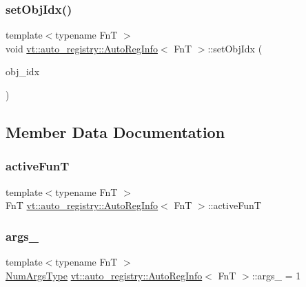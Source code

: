 \subsubsection{\texorpdfstring{set\+Obj\+Idx()}{setObjIdx()}}
{\footnotesize\ttfamily template$<$typename FnT $>$ \\
void \hyperlink{structvt_1_1auto__registry_1_1_auto_reg_info}{vt\+::auto\+\_\+registry\+::\+Auto\+Reg\+Info}$<$ FnT $>$\+::set\+Obj\+Idx (\begin{DoxyParamCaption}\item[{\hyperlink{namespacevt_1_1auto__registry_ae295e18699146815bb7d7674594d95d7}{Auto\+Handler\+Type} const}]{obj\+\_\+idx }\end{DoxyParamCaption})\hspace{0.3cm}{\ttfamily [inline]}}



\subsection{Member Data Documentation}
\mbox{\label{structvt_1_1auto__registry_1_1_auto_reg_info_a0ce7e02e8be36c770dead608e23709c6}} 
\subsubsection{\texorpdfstring{active\+FunT}{activeFunT}}
{\footnotesize\ttfamily template$<$typename FnT $>$ \\
FnT \hyperlink{structvt_1_1auto__registry_1_1_auto_reg_info}{vt\+::auto\+\_\+registry\+::\+Auto\+Reg\+Info}$<$ FnT $>$\+::active\+FunT}

\mbox{\label{structvt_1_1auto__registry_1_1_auto_reg_info_a861ecaa80da263959457a5429c3a3716}} 
\subsubsection{\texorpdfstring{args\+\_\+}{args\_}}
{\footnotesize\ttfamily template$<$typename FnT $>$ \\
\hyperlink{namespacevt_1_1auto__registry_aebda1d9d765bc9147dc654ad0712c936}{Num\+Args\+Type} \hyperlink{structvt_1_1auto__registry_1_1_auto_reg_info}{vt\+::auto\+\_\+registry\+::\+Auto\+Reg\+Info}$<$ FnT $>$\+::args\+\_\+ = 1}

